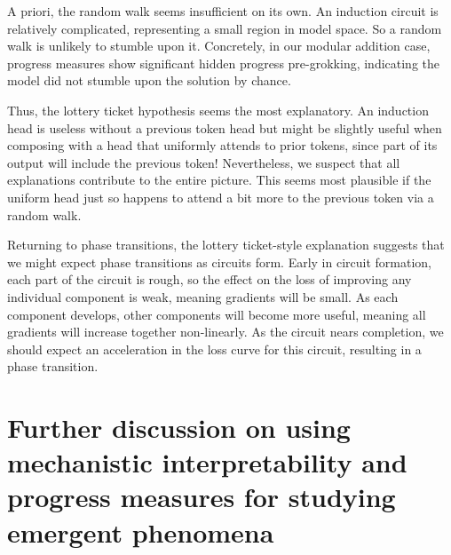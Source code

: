 \documentclass{article} %
\begin{document}
A priori, the random walk seems insufficient on its own. An induction circuit is relatively complicated, representing a small region in model space. So a random walk is unlikely to stumble upon it. Concretely, in our modular addition case, progress measures show significant hidden progress pre-grokking, indicating the model did not stumble upon the solution by chance.

Thus, the lottery ticket hypothesis seems the most explanatory. An induction head is useless without a previous token head but might be slightly useful when composing with a head that uniformly attends to prior tokens, since part of its output will include the previous token! Nevertheless, we suspect that all explanations contribute to the entire picture. This seems most plausible if the uniform head just so happens to attend a bit more to the previous token via a random walk.

Returning to phase transitions, the lottery ticket-style explanation suggests that we might expect phase transitions as circuits form. Early in circuit formation, each part of the circuit is rough, so the effect on the loss of improving any individual component is weak, meaning gradients will be small. As each component develops, other components will become more useful, meaning all gradients will increase together non-linearly. As the circuit nears completion, we should expect an acceleration in the loss curve for this circuit, resulting in a phase transition.

\section{Further discussion on using mechanistic interpretability and progress measures for studying emergent phenomena}
\end{document}
